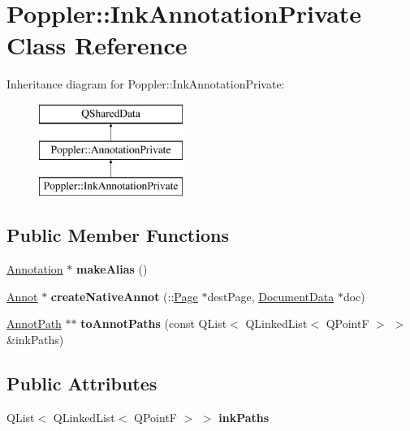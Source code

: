 \hypertarget{class_poppler_1_1_ink_annotation_private}{}\section{Poppler\+:\+:Ink\+Annotation\+Private Class Reference}
\label{class_poppler_1_1_ink_annotation_private}
Inheritance diagram for Poppler\+:\+:Ink\+Annotation\+Private\+:\begin{figure}[H]
\begin{center}
\leavevmode
\includegraphics[height=3.000000cm]{class_poppler_1_1_ink_annotation_private}
\end{center}
\end{figure}
\subsection*{Public Member Functions}
\begin{DoxyCompactItemize}
\item 
\mbox{\label{class_poppler_1_1_ink_annotation_private_a49d61a7c1059e755637c259a269d1dee}} 
\hyperlink{class_poppler_1_1_annotation}{Annotation} $\ast$ {\bfseries make\+Alias} ()
\item 
\mbox{\label{class_poppler_1_1_ink_annotation_private_a64be34213c547c543f42af2aaa0835fd}} 
\hyperlink{class_annot}{Annot} $\ast$ {\bfseries create\+Native\+Annot} (\+::\hyperlink{class_poppler_1_1_page}{Page} $\ast$dest\+Page, \hyperlink{class_poppler_1_1_document_data}{Document\+Data} $\ast$doc)
\item 
\mbox{\label{class_poppler_1_1_ink_annotation_private_a24328e553a9efdcc5503279d187cd2cb}} 
\hyperlink{class_annot_path}{Annot\+Path} $\ast$$\ast$ {\bfseries to\+Annot\+Paths} (const Q\+List$<$ Q\+Linked\+List$<$ Q\+PointF $>$ $>$ \&ink\+Paths)
\end{DoxyCompactItemize}
\subsection*{Public Attributes}
\begin{DoxyCompactItemize}
\item 
\mbox{\label{class_poppler_1_1_ink_annotation_private_a4bacd2aed198613fd5d691ebdc1b6c81}} 
Q\+List$<$ Q\+Linked\+List$<$ Q\+PointF $>$ $>$ {\bfseries ink\+Paths}
\end{DoxyCompactItemize}
